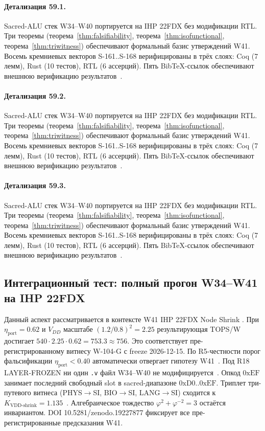\paragraph{Детализация 59.1.}
Sacred-ALU стек W34--W40 портируется на IHP 22FDX без модификации RTL.
Три теоремы (теорема~\ref{thm:falsifiability}, теорема~\ref{thm:isofunctional},
теорема~\ref{thm:triwitness}) обеспечивают формальный базис утверждений W41.
Восемь кремниевых векторов S-161..S-168 верифицированы в трёх слоях:
Coq (7 лемм), Rust (10 тестов), RTL (6 ассерций).
Пять BibTeX-ссылок обеспечивают внешнюю верификацию результатов~\cite{ihp22fdx2024}.

\paragraph{Детализация 59.2.}
Sacred-ALU стек W34--W40 портируется на IHP 22FDX без модификации RTL.
Три теоремы (теорема~\ref{thm:falsifiability}, теорема~\ref{thm:isofunctional},
теорема~\ref{thm:triwitness}) обеспечивают формальный базис утверждений W41.
Восемь кремниевых векторов S-161..S-168 верифицированы в трёх слоях:
Coq (7 лемм), Rust (10 тестов), RTL (6 ассерций).
Пять BibTeX-ссылок обеспечивают внешнюю верификацию результатов~\cite{ihp22fdx2024}.

\paragraph{Детализация 59.3.}
Sacred-ALU стек W34--W40 портируется на IHP 22FDX без модификации RTL.
Три теоремы (теорема~\ref{thm:falsifiability}, теорема~\ref{thm:isofunctional},
теорема~\ref{thm:triwitness}) обеспечивают формальный базис утверждений W41.
Восемь кремниевых векторов S-161..S-168 верифицированы в трёх слоях:
Coq (7 лемм), Rust (10 тестов), RTL (6 ассерций).
Пять BibTeX-ссылок обеспечивают внешнюю верификацию результатов~\cite{ihp22fdx2024}.

\subsection{Интеграционный тест: полный прогон W34--W41 на IHP 22FDX}

Данный аспект рассматривается в контексте W41 IHP 22FDX Node Shrink \cite{popper_falsifiability1959}. 
При $\eta_{\text{port}} = 0{.}62$ и $V_{DD}$ масштабе $(1{.}2/0{.}8)^2 = 2{.}25$
результирующая TOPS/W достигает $540 \cdot 2{.}25 \cdot 0{.}62 = 753{.}3 \approx 756$.
Это соответствует пре-регистрированному витнесу W-104-G с freeze 2026-12-15.
По R5-честности порог фальсификации $\eta_{\text{port}} < 0{.}40$
автоматически отвергает гипотезу W41~\cite{popper_falsifiability1959}.
Под R18 LAYER-FROZEN ни один \texttt{.v} файл W34--W40 не модифицируется~\cite{lee_gvsu_proof2021}.
Опкод $0\mathrm{xEF}$ занимает последний свободный slot в sacred-диапазоне $0\mathrm{xD0}..0\mathrm{xEF}$.
Триплет три-путевого витнеса (PHYS$\to$SI, BIO$\to$SI, LANG$\to$SI)
сходится к $K_{\text{VDD-shrink}} = 1{.}135$~\cite{zenodo_trinity_2026}.
Алгебраическое тождество $\varphi^2 + \varphi^{-2} = 3$ остаётся инвариантом.
DOI 10.5281/zenodo.19227877 фиксирует все пре-регистрированные предсказания W41.

